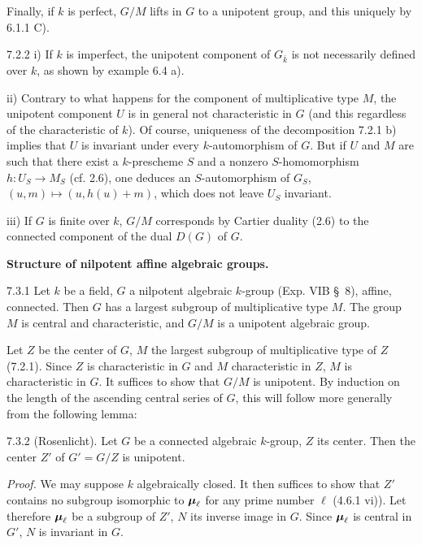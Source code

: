 Finally, if $k$ is perfect, $G/M$ lifts in $G$ to a unipotent group, and this uniquely by 6.1.1 C).
\begin{remark}{7.2.2}\label{XVII.7.2.2}
\noindent i) If $k$ is imperfect, the unipotent component of $G_{\bar k}$ is not necessarily defined over $k$, as shown by example 6.4 a).

\noindent ii) Contrary to what happens for the component of multiplicative type $M$, the unipotent component $U$ is in general not characteristic in $G$ (and this regardless of the characteristic of $k$). Of course, uniqueness of the decomposition 7.2.1 b) implies that $U$ is invariant under every $k$-automorphism of $G$. But if $U$ and $M$ are such that there exist a $k$-prescheme $S$ and a nonzero $S$-homomorphism $h:U_S\to M_S$ (cf. 2.6), one deduces an $S$-automorphism of $G_S$, $(u,m)\mapsto(u,h(u)+m)$, which does not leave $U_S$ invariant.

\noindent iii) If $G$ is finite over $k$, $G/M$ corresponds by Cartier duality (2.6) to the connected component of the dual $D(G)$ of $G$.
\end{remark}
\label{XVII.7.3}\textbf{Structure of nilpotent affine algebraic groups.}
\begin{theorem}{7.3.1}\label{XVII.7.3.1}
Let $k$ be a field, $G$ a nilpotent algebraic $k$-group (Exp. VIB \S\ 8), affine, connected. Then $G$ has a largest subgroup of multiplicative type $M$. The group $M$ is central and characteristic, and $G/M$ is a unipotent algebraic group.
\end{theorem}
Let $Z$ be the center of $G$, $M$ the largest subgroup of multiplicative type of $Z$ (7.2.1). Since $Z$ is characteristic in $G$ and $M$ characteristic in $Z$, $M$ is characteristic in $G$. It suffices to show that $G/M$ is unipotent. By induction on the length of the ascending central series of $G$, this will follow more generally from the following lemma:
\begin{lemma}{7.3.2}\label{XVII.7.3.2}
(Rosenlicht). Let $G$ be a connected algebraic $k$-group, $Z$ its center. Then the center $Z'$ of $G'=G/Z$ is unipotent.
\end{lemma}
\par\noindent\emph{Proof.}
We may suppose $k$ algebraically closed. It then suffices to show that $Z'$ contains no subgroup isomorphic to $\boldsymbol{\mu}_\ell$ for any prime number $\ell$ (4.6.1 vi)). Let therefore $\boldsymbol{\mu}_\ell$ be a subgroup of $Z'$, $N$ its inverse image in $G$. Since $\boldsymbol{\mu}_\ell$ is central in $G'$, $N$ is invariant in $G$.


